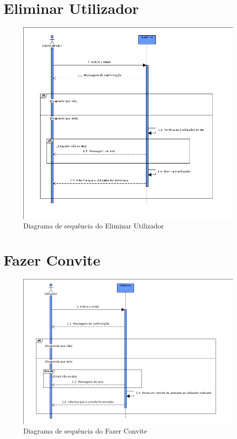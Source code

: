 \documentclass[a4paper]{report}
\begin{document}
\section{Eliminar Utilizador}
\begin{figure}[H]
	\centering 
    \includegraphics[width=\textwidth]{images/elemuserSeq.png}  
    \caption{Diagrama de sequência do Eliminar Utilizador}
\end{figure}

\section{Fazer Convite}
\begin{figure}[H]
	\centering 
    \includegraphics[width=\textwidth]{images/fazerconviteSeq.png}  
    \caption{Diagrama de sequência do Fazer Convite}
\end{figure}
\end{document}
